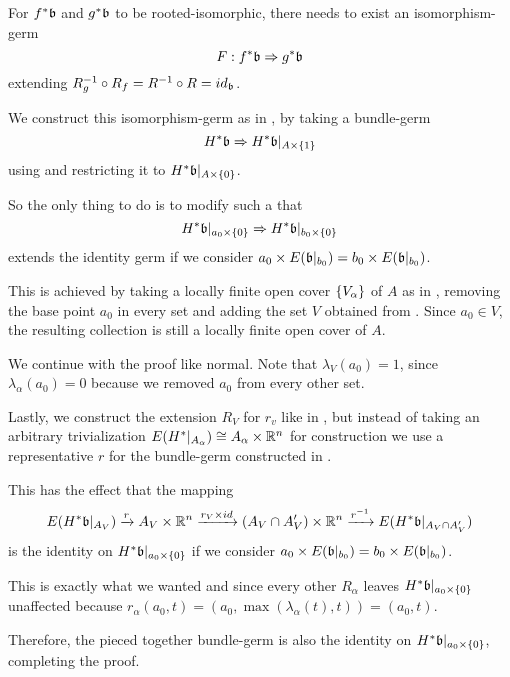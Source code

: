 \begin{myproof}
    For $f^*\mathfrak{b}$ and $g^*\mathfrak{b}$ to be rooted-isomorphic,
    there needs to exist an isomorphism-germ
    \[ F: f^*\mathfrak{b} \Rightarrow{} g^*\mathfrak{b} \]
    extending $R_g^{-1} \circ R_f = R^{-1} \circ R = id_{\mathfrak{b}}$.

    We construct this isomorphism-germ as in ,
    by taking a bundle-germ
    \[ H^*\mathfrak{b} \Rightarrow{} H^*\mathfrak{b}\vert_{A \times{} \{1\}} \]
    using  and restricting it to $H^*\mathfrak{b}\vert_{A \times{} \{0\}}$.

    So the only thing to do is to modify  such a that
    \[ H^*\mathfrak{b}\vert_{a_0 \times{} \{0\}} \Rightarrow{} H^*\mathfrak{b}\vert_{b_0 \times{} \{0\}} \]
    extends the identity germ if we consider $a_0 \times E(\mathfrak{b}\vert_{b_0}) = b_0 \times E(\mathfrak{b}\vert_{b_0})$.

    This is achieved by taking a locally finite open cover $\{V_\alpha\}$
    of $A$ as in , removing the base point $a_0$ in every set
    and adding the set $V$ obtained from .
    Since $a_0 \in V$, the resulting collection is still a locally finite open cover of $A$.

    We continue with the proof like normal.
    Note that $\lambda_V(a_0) = 1$,
    since $\lambda_\alpha(a_0) = 0$ because we removed $a_0$ from every other set.

    Lastly, we construct the extension $R_V$ for $r_v$ like in ,
    but instead of taking an arbitrary trivialization $E(H^*\vert_{A_\alpha}) \cong A_\alpha \times \mathbb{R}^n$
    for construction we use a representative $r$ for the bundle-germ constructed in .
    
    This has the effect that the mapping
    \[
        E(H^*\mathfrak{b}\vert_{A_V}) \xrightarrow{r}
        A_V \times \mathbb{R}^n \xrightarrow{r_V \times id} (A_V \cap A'_V) \times \mathbb{R}^n
        \xrightarrow{r^{-1}} E(H^*\mathfrak{b}\vert_{A_V \cap A'_V})
    \]
    is the identity on $H^*\mathfrak{b}\vert_{a_0 \times{} \{0\}}$ if we consider $a_0 \times E(\mathfrak{b}\vert_{b_0}) = b_0 \times E(\mathfrak{b}\vert_{b_0})$.

    This is exactly what we wanted and since
    every other $R_\alpha$ leaves $H^*\mathfrak{b}\vert_{a_0 \times{} \{0\}}$ unaffected
    because $r_\alpha(a_0, t) = (a_0, \max(\lambda_\alpha(t), t)) = (a_0, t)$.

    Therefore, the pieced together bundle-germ
    is also the identity on $H^*\mathfrak{b}\vert_{a_0 \times{} \{0\}}$, completing the proof.
\end{myproof}
